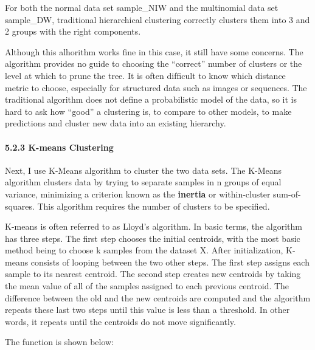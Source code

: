 \documentclass{article}
\begin{document}
    For both the normal data set sample\_NIW and the multinomial data set
sample\_DW, traditional hierarchical clustering correctly clusters them
into 3 and 2 groups with the right components.

Although this alhorithm works fine in this case, it still have some
concerns. The algorithm provides no guide to choosing the ``correct''
number of clusters or the level at which to prune the tree. It is often
difﬁcult to know which distance metric to choose, especially for
structured data such as images or sequences. The traditional algorithm
does not deﬁne a probabilistic model of the data, so it is hard to ask
how ``good'' a clustering is, to compare to other models, to make
predictions and cluster new data into an existing hierarchy.

    \paragraph{5.2.3 K-means Clustering}\label{k-means-clustering}

Next, I use K-Means algorithm to cluster the two data sets. The K-Means
algorithm clusters data by trying to separate samples in n groups of
equal variance, minimizing a criterion known as the \textbf{inertia} or
within-cluster sum-of-squares. This algorithm requires the number of
clusters to be specified.

K-means is often referred to as Lloyd's algorithm. In basic terms, the
algorithm has three steps. The first step chooses the initial centroids,
with the most basic method being to choose k samples from the dataset X.
After initialization, K-means consists of looping between the two other
steps. The first step assigns each sample to its nearest centroid. The
second step creates new centroids by taking the mean value of all of the
samples assigned to each previous centroid. The difference between the
old and the new centroids are computed and the algorithm repeats these
last two steps until this value is less than a threshold. In other
words, it repeats until the centroids do not move significantly.

The function is shown below:
\end{document}
